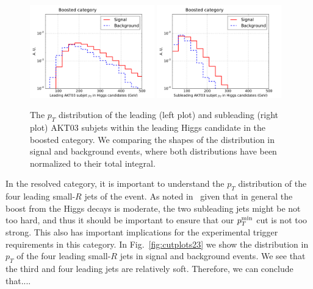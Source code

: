 \begin{figure}[t]
\begin{center}
 \includegraphics[width=0.48\textwidth]{plots/pt_leadSJ_fj1_noPU.pdf}
 \includegraphics[width=0.48\textwidth]{plots/pt_subleadSJ_fj1_noPU.pdf}
\caption{\small  The $p_T$ distribution of the
  leading (left plot) and
  subleading (right plot) AKT03 subjets within the leading
  Higgs candidate in the boosted category.
  We comparing
  the shapes of the distribution in signal and background events,
  where both
  distributions have been normalized to their total integral.
}
\label{fig:cutplots22}
\end{center}
\end{figure}



In the resolved category,
it is important to understand the $p_T$ distribution
of the four leading small-$R$ jets of the event.
%
As noted in~\cite{deLima:2014dta}
given that in general the boost from the Higgs decays is moderate,
the two subleading jets might be not too hard, and thus it
should be important to ensure that our $p_T^{\rm min}$ cut
is not too strong.
%
This also has important implications for the experimental
trigger requirements in this category.
%
In Fig.~\ref{fig:cutplots23}
we show the distribution in $p_T$ of the four leading
small-$R$ jets in signal and background events.
%
We see that the third and four leading jets are relatively soft.
%
Therefore, we can conclude that....


